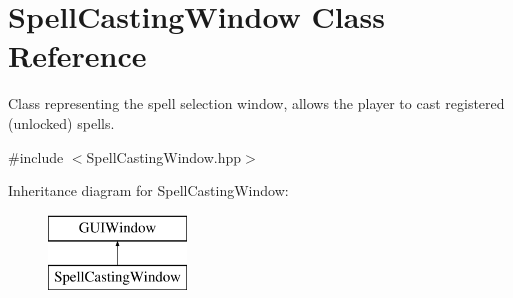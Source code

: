 \hypertarget{class_spell_casting_window}{}\section{Spell\+Casting\+Window Class Reference}
\label{class_spell_casting_window}


Class representing the spell selection window, allows the player to cast registered (unlocked) spells.  




{\ttfamily \#include $<$Spell\+Casting\+Window.\+hpp$>$}

Inheritance diagram for Spell\+Casting\+Window\+:\begin{figure}[H]
\begin{center}
\leavevmode
\includegraphics[height=2.000000cm]{class_spell_casting_window}
\end{center}
\end{figure}
